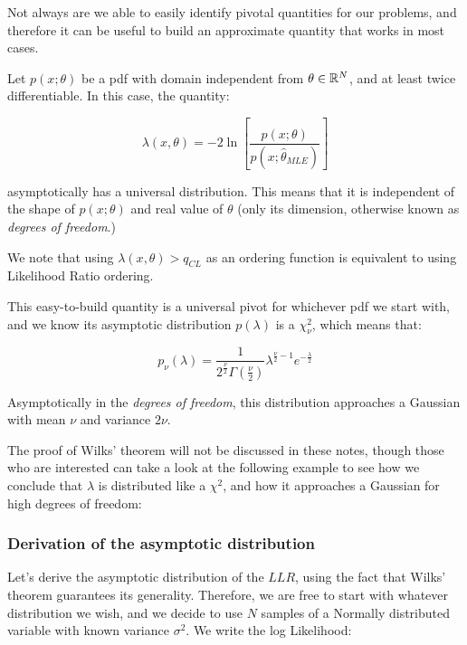 Not always are we able to easily identify pivotal quantities for our problems, and therefore it can be useful to build an approximate quantity that works in most cases.

\begin{theorem}
	Let $p(x;\theta)$ be a pdf with domain independent from $\theta\in \mathbb{R}^N$, and at least twice differentiable. In this case, the quantity:
	
	\begin{equation}
	\lambda\left(x,\theta\right) = -2\ln\left[\frac{p(x;\theta)}{p(x;\hat{\theta}_{MLE})}\right]
	\tag{Log-Likelihood ratio}
	\end{equation}
	
	asymptotically has a universal distribution. This means that it is independent of the shape of $p(x;\theta)$ and real value of $\theta$ (only its dimension, otherwise known as \emph{degrees of freedom}.)
\end{theorem}

We note that using $\lambda(x,\theta)> q_{CL}$ as an ordering function is equivalent to using Likelihood Ratio ordering.

This easy-to-build quantity is a universal pivot for whichever pdf we start with, and we know its asymptotic distribution $p(\lambda)$ is a $\chi^2_\nu$, which means that:

	\begin{equation}
	p_\nu(\lambda) = \frac{1}{2^{\frac{\nu}{2}} \Gamma(\frac{\nu}{2})}\lambda^{\frac{\nu}{2}-1}e^{-\frac{\lambda}{2}}
	\label{eq:chi_squared}
	\end{equation}

Asymptotically in the \emph{degrees of freedom}, this distribution approaches a Gaussian with mean $\nu$ and variance $2\nu$. 

The proof of Wilks' theorem will not be discussed in these notes, though those who are interested can take a look at the following example to see how we conclude that $\lambda$ is distributed like a $\chi^2$, and how it approaches a Gaussian for high degrees of freedom:

\subsubsection{Derivation of the asymptotic distribution}
Let's derive the asymptotic distribution of the $LLR$, using the fact that Wilks' theorem guarantees its generality. Therefore, we are free to start with whatever distribution we wish, and we decide to use $N$ samples of a Normally distributed variable with known variance $\sigma^2$. We write the log Likelihood:
	
